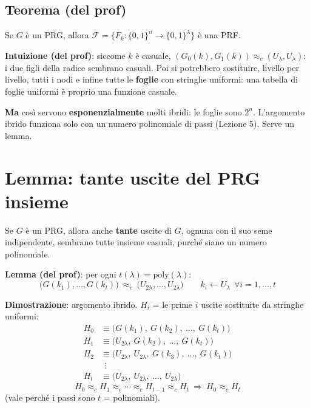 \subsection{Teorema (del prof)}

Se \(G\) è un PRG, allora \(\mathcal{F} = \{F_k : \{0,1\}^n \to \{0,1\}^\lambda\}\) è una PRF.

\textbf{Intuizione (del prof)}: siccome \(k\) è casuale, \((G_0(k), G_1(k)) \approx_c (U_\lambda, U_\lambda)\): i due figli della radice sembrano casuali. Poi si potrebbero sostituire, livello per livello, tutti i nodi e infine tutte le \textbf{foglie} con stringhe uniformi: una tabella di foglie uniformi è proprio una funzione casuale.

\textbf{Ma} così servono \textbf{esponenzialmente} molti ibridi: le foglie sono \(2^n\). L'argomento ibrido funziona solo con un numero polinomiale di passi (Lezione 5). Serve un lemma.

\section{Lemma: tante uscite del PRG insieme}

\begin{inbreve}
Se \(G\) è un PRG, allora anche \textbf{tante} uscite di \(G\), ognuna con il suo seme indipendente, sembrano tutte insieme casuali, purché siano un numero polinomiale.
\end{inbreve}

\textbf{Lemma (del prof)}: per ogni \(t(\lambda) = \text{poly}(\lambda)\):
\[
\big(G(k_1), \dots, G(k_t)\big) \ \approx_c\ \big(U_{2\lambda}, \dots, U_{2\lambda}\big) \qquad k_i \leftarrow U_\lambda \ \ \forall i = 1, \dots, t
\]

\textbf{Dimostrazione}: argomento ibrido. \(H_i\) = le prime \(i\) uscite sostituite da stringhe uniformi:
\begin{align*}
H_0 &\equiv \big(G(k_1),\ G(k_2),\ \dots,\ G(k_t)\big) \\
H_1 &\equiv \big(U_{2\lambda},\ G(k_2),\ \dots,\ G(k_t)\big) \\
H_2 &\equiv \big(U_{2\lambda},\ U_{2\lambda},\ G(k_3),\ \dots,\ G(k_t)\big) \\
&\ \ \vdots \\
H_t &\equiv \big(U_{2\lambda},\ U_{2\lambda},\ \dots,\ U_{2\lambda}\big)
\end{align*}
\[
H_0 \approx_c H_1 \approx_c \cdots \approx_c H_{t-1} \approx_c H_t \ \Rightarrow\ H_0 \approx_c H_t
\]
(vale perché i passi sono \(t\) = polinomiali).

